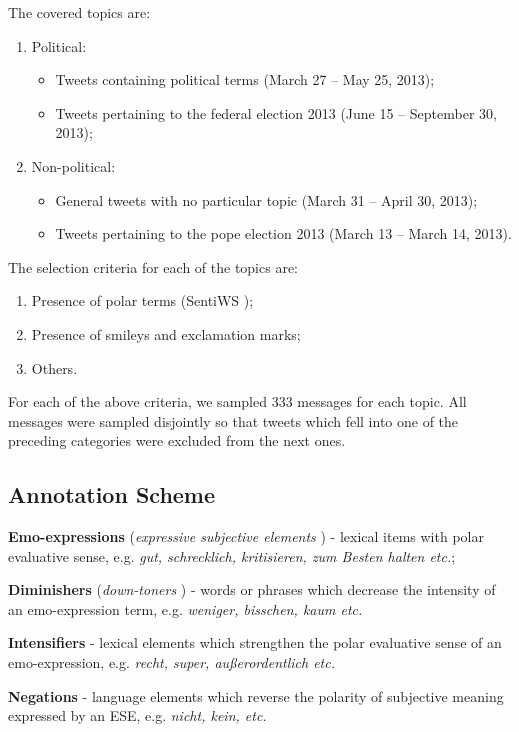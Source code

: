 \documentclass{beamer}
\begin{document}
\begin{frame}{}
  The covered topics are:
  \begin{enumerate}
  \item Political:
    \begin{itemize}
    \item Tweets containing political terms {\tiny(March 27 --
      May 25, 2013)};
    \item Tweets pertaining to the federal election 2013
      {\tiny(June 15 -- September 30, 2013)};
    \end{itemize}

  \item Non-political:
    \begin{itemize}
    \item General tweets with no particular topic {\tiny(March
      31 -- April 30, 2013)};
    \item Tweets pertaining to the pope election 2013
      {\tiny(March 13 -- March 14, 2013)}.
    \end{itemize}
  \end{enumerate}
\end{frame}

\begin{frame}{}
  The selection criteria for each of the topics are:
  \begin{enumerate}
  \item Presence of polar terms (SentiWS \cite{Remus-10});
  \item Presence of smileys and exclamation marks;
  \item Others.
  \end{enumerate}
  For each of the above criteria, we sampled 333 messages for each
  topic.  All messages were sampled disjointly so that tweets
  which fell into one of the preceding categories were excluded
  from the next ones.
\end{frame}

\subsection{Annotation Scheme}
\begin{frame}{}
  \textbf{Emo-expressions} (\textit{expressive subjective elements}
  \cite{Wiebe-05}) - lexical items with polar evaluative sense,
  e.g. \textit{gut, schrecklich, kritisieren, zum Besten halten etc.};

  \textbf{Diminishers} (\textit{down-toners} \cite{Taboada-11}) - words or
  phrases which decrease the intensity of an emo-expression term,
  e.g. \textit{weniger, bisschen, kaum etc.}

  \textbf{Intensifiers} - lexical elements which strengthen the
  polar evaluative sense of an emo-expression, e.g. \textit{recht,
    super, au\ss{}erordentlich etc.}

  \textbf{Negations} - language elements which reverse the
  polarity of subjective meaning expressed by an ESE,
  e.g. \textit{nicht, kein, etc.}
\end{frame}
\end{document}
